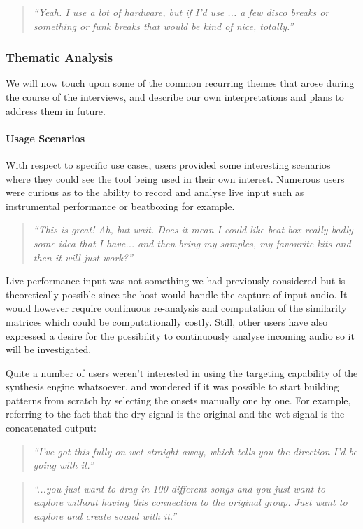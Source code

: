 \blockquote{\textit{“Yeah. I use a lot of hardware, but if I'd use ... a few disco breaks or something or funk breaks that would be kind of nice, totally.”}}

\subsubsection{Thematic Analysis}

We will now touch upon some of the common recurring themes that arose during the course of the interviews, and describe our own interpretations and plans to address them in future.

\paragraph{Usage Scenarios}

With respect to specific use cases, users provided some interesting scenarios where they could see the tool being used in their own interest. Numerous users were curious as to the ability to record and analyse live input such as instrumental performance or beatboxing for example.

\blockquote{\textit{“This is great! Ah, but wait. Does it mean I could like beat box really badly some idea that I have... and then bring my samples, my favourite kits and then it will just work?”}}

Live performance input was not something we had previously considered but is theoretically possible since the host would handle the capture of input audio. It would however require continuous re-analysis and computation of the similarity matrices which could be computationally costly. Still, other users have also expressed a desire for the possibility to continuously analyse incoming audio so it will be investigated.

Quite a number of users weren't interested in using the targeting capability of the synthesis engine whatsoever, and wondered if it was possible to start building patterns from scratch by selecting the onsets manually one by one. For example, referring to the fact that the dry signal is the original and the wet signal is the concatenated output:

\blockquote{\textit{ “I've got this fully on wet straight away, which tells you the direction I'd be going with it.”}}

\blockquote{\textit{“...you just want to drag in 100 different songs and you just want to explore without having this connection to the original group. Just want to explore and create sound with it.”}}

